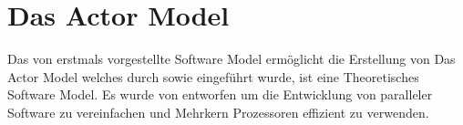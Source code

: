 \chapter{Das Actor Model}
Das von \cite{hewitt1973session} erstmals vorgestellte Software Model ermöglicht die Erstellung von 
Das Actor Model welches durch \cite{hewitt1973session} sowie \cite{Agha1985ActorsSystems} eingeführt wurde, ist eine Theoretisches Software Model. 
Es wurde von \cite{hewitt1973session} entworfen um die Entwicklung von paralleler Software zu vereinfachen und Mehrkern Prozessoren effizient zu verwenden.